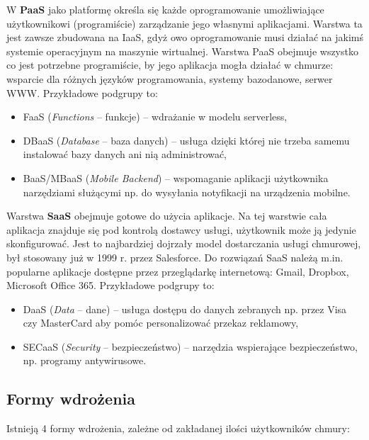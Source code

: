 \documentclass[12pt,a4paper,twoside,titlepage,openright]{book}
\begin{document}
W \textbf{PaaS} jako platformę określa się każde oprogramowanie umożliwiające użytkownikowi (programiście) zarządzanie jego własnymi aplikacjami. Warstwa ta jest zawsze zbudowana na IaaS, gdyż owo oprogramowanie musi działać na jakimś systemie operacyjnym na maszynie wirtualnej. Warstwa PaaS obejmuje wszystko co jest potrzebne programiście, by jego aplikacja mogła działać w chmurze: wsparcie dla różnych języków programowania, systemy bazodanowe, serwer WWW. Przykładowe podgrupy to:
\begin{itemize}
\item FaaS (\textit{Functions} -- funkcje) -- wdrażanie w modelu serverless,
\item DBaaS (\textit{Database} -- baza danych) -- usługa dzięki której nie trzeba samemu instalować bazy danych ani nią administrować,
\item BaaS/MBaaS (\textit{Mobile Backend}) -- wspomaganie aplikacji użytkownika narzędziami służącymi np. do wysyłania notyfikacji na urządzenia mobilne.
\end{itemize}

Warstwa \textbf{SaaS} obejmuje gotowe do użycia aplikacje. Na tej warstwie cała aplikacja znajduje się pod kontrolą dostawcy usługi, użytkownik może ją jedynie skonfigurować. Jest to najbardziej dojrzały model dostarczania usługi chmurowej, był stosowany już w 1999 r. przez Salesforce. Do rozwiązań SaaS należą m.in. popularne aplikacje dostępne przez przeglądarkę internetową: Gmail, Dropbox, Microsoft Office 365. Przykładowe podgrupy to:
\begin{itemize}
\item DaaS (\textit{Data} -- dane) -- usługa dostępu do danych zebranych np. przez Visa czy MasterCard aby pomóc personalizować przekaz reklamowy,
\item SECaaS (\textit{Security} -- bezpieczeństwo) -- narzędzia wspierające bezpieczeństwo, np. programy antywirusowe.
\end{itemize}

\subsection{Formy wdrożenia}

Istnieją 4 formy wdrożenia, zależne od zakładanej ilości użytkowników chmury:
\end{document}
